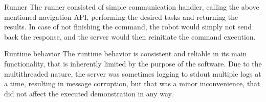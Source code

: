 \secc Runner
The runner consisted of simple communication handler, calling the above mentioned navigation API, performing the desired tasks and returning the results. In case of not finishing the command, the robot would simply not send back the response, and the server would then reinitiate the command execution.

\sec Runtime behavior
The runtime behavior is consistent and reliable in its main functionality, that is inherently limited by the purpose of the software.\br
Due to the multithreaded nature, the server was sometimes logging to stdout multiple logs at a time, resulting in message corruption, but that was a minor inconvenience, that did not affect the executed demonstration in any way.
